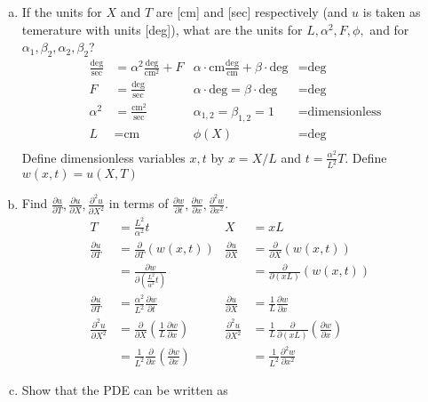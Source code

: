 \documentclass{article}
\begin{document}
\begin{enumerate}[(a)]
\item
If the units for $X$ and $T$ are [cm] and [sec] respectively (and $u$ is taken as temerature with units [deg]), what are the units for $L,\alpha^2,F,\phi,$ and for $\alpha_1,\beta_2,\alpha_2,\beta_2$?
\begin{align*}
  \frac{\text{deg}}{\text{sec}}&=\alpha^2\frac{\text{deg}}{\text{cm}^2}+F&\alpha\cdot\text{cm}\frac{\text{deg}}{\text{cm}}+\beta\cdot\text{deg}&=\text{deg}\\
  F&=\frac{\text{deg}}{\text{sec}}&\alpha\cdot\text{deg}=\beta\cdot\text{deg}&=\text{deg}\\
  \alpha^2&=\frac{\text{cm}^2}{\text{sec}}&\alpha_{1,2}=\beta_{1,2}=1&=\text{dimensionless}\\
  L&=\text{cm}&\phi(X)&=\text{deg}\\
\end{align*}
Define dimensionless variables $x,t$ by $x=X/L$ and $t=\frac{\alpha^2}{L^2}T$. Define $w(x,t)=u(X,T)$
\item
Find $\frac{\partial u}{\partial T},\frac{\partial u}{\partial X},\frac{\partial^2 u}{\partial X^2}$ in terms of $\frac{\partial w}{\partial t},\frac{\partial w}{\partial x},\frac{\partial^2 w}{\partial x^2}$.
\begin{align*}
  T&=\frac{L^2}{\alpha^2}t&X&=xL&\\
  \frac{\partial u}{\partial T}&=\frac{\partial }{\partial T}\left(w(x,t)\right)&\frac{\partial u}{\partial X}&=\frac{\partial }{\partial X}(w(x,t))\\
  &=\frac{\partial w}{\partial \left(\frac{L^2}{\alpha^2}t\right)}&&=\frac{\partial }{\partial (xL)}(w(x,t))\\
  \frac{\partial u}{\partial T}&=\frac{\alpha^2}{L^2}\frac{\partial w}{\partial t}&\frac{\partial u}{\partial X}&=\frac{1}{L}\frac{\partial w}{\partial x}\\
  \frac{\partial ^2u}{\partial X^2}&=\frac{\partial }{\partial X}\left(\frac{1}{L}\frac{\partial w}{\partial x}\right)&\frac{\partial ^2u}{\partial X^2}&=\frac{1}{L}\frac{\partial }{\partial \left(xL\right)}\left(\frac{\partial w}{\partial x}\right)\\
  &=\frac{1}{L^2}\frac{\partial}{\partial x}\left(\frac{\partial w}{\partial x}\right)&&=\frac{1}{L^2}\frac{\partial ^2w}{\partial x^2}
\end{align*}
\item
Show that the PDE can be written as
\begin{align*}

\end{align*}
\end{enumerate}
\end{document}
